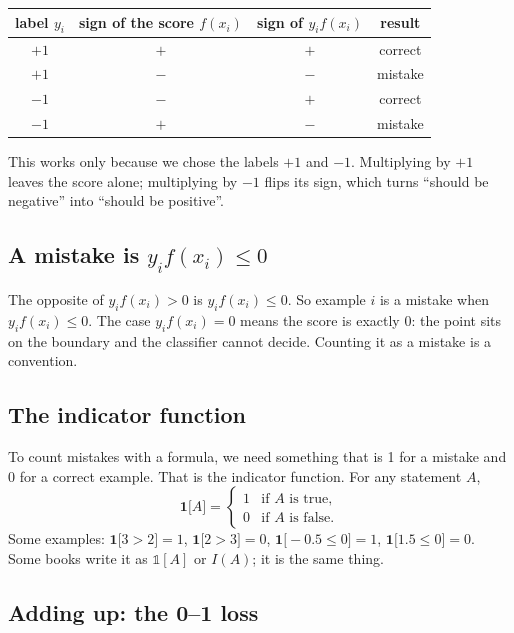 \documentclass[11pt]{article}
\newcommand{\ind}[1]{\mathbf{1}\bigl[#1\bigr]}
\begin{document}
\begin{center}
\begin{tabular}{cccc}
  \toprule
  label $y_i$ & sign of the score $f(x_i)$ & sign of $y_i f(x_i)$ & result \\
  \midrule
  $+1$ & $+$ & $+$ & correct \\
  $+1$ & $-$ & $-$ & mistake \\
  $-1$ & $-$ & $+$ & correct \\
  $-1$ & $+$ & $-$ & mistake \\
  \bottomrule
\end{tabular}
\end{center}

This works only because we chose the labels $+1$ and $-1$. Multiplying by $+1$ leaves the score
alone; multiplying by $-1$ flips its sign, which turns ``should be negative'' into ``should be
positive''.

\subsection{A mistake is $y_i f(x_i) \le 0$}

The opposite of $y_i f(x_i) > 0$ is $y_i f(x_i) \le 0$. So example $i$ is a mistake when
$y_i f(x_i) \le 0$. The case $y_i f(x_i) = 0$ means the score is exactly 0: the point sits on the
boundary and the classifier cannot decide. Counting it as a mistake is a convention.

\subsection{The indicator function}

To count mistakes with a formula, we need something that is 1 for a mistake and 0 for a correct
example. That is the indicator function. For any statement $A$,
\[
  \ind{A} =
  \begin{cases}
    1 & \text{if } A \text{ is true}, \\
    0 & \text{if } A \text{ is false}.
  \end{cases}
\]
Some examples: $\ind{3 > 2} = 1$, $\ind{2 > 3} = 0$, $\ind{-0.5 \le 0} = 1$, $\ind{1.5 \le 0} = 0$.
Some books write it as $\mathbb{1}[A]$ or $I(A)$; it is the same thing.

\subsection{Adding up: the 0--1 loss}
\end{document}
